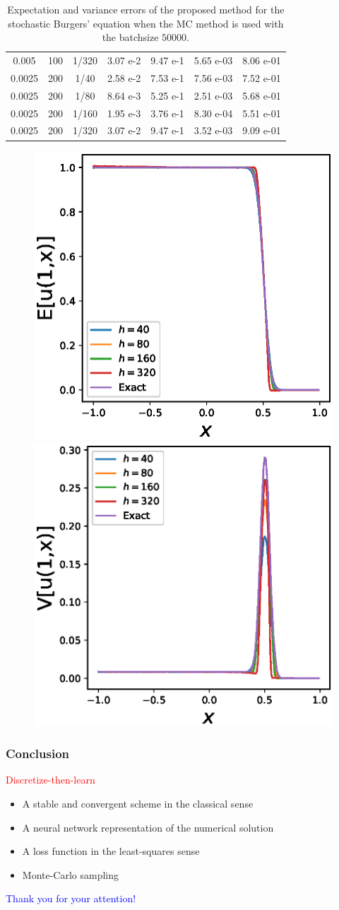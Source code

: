 \documentclass[aspectratio=169]{beamer}
\begin{document}
\begin{frame}
\begin{table}[htbp]
\begin{tabular}{|c|c|c|c|c|c|c|}
		0.005 & 100 & 1/320 & 3.07 e-2 & 9.47 e-1& 5.65 e-03 & 8.06 e-01\\
		0.0025 & 200 & 1/40 & 2.58 e-2 & 7.53 e-1 & 7.56 e-03 & 7.52 e-01\\
		0.0025 & 200 & 1/80 & 8.64 e-3 & 5.25 e-1 & 2.51 e-03 & 5.68 e-01\\
		0.0025 & 200 & 1/160 & 1.95 e-3 & 3.76 e-1 & 8.30 e-04 & 5.51 e-01\\
		0.0025 & 200 & 1/320 & 3.07 e-2 & 9.47 e-1 & 3.52 e-03 & 9.09 e-01\\
		\hline
	\end{tabular}
	\caption{Expectation and variance errors of the proposed method for the stochastic Burgers' equation when the MC method is used with the batchsize $50000$.}
	\label{tbl: s Bur equation 50000 eroor}
\end{table}
\end{frame}
\begin{figure}
\includegraphics[width = 0.4\linewidth]{Figure/Burgus_equation_storchstic_dim_s_10_eps_005_E}
\includegraphics[width = 0.4\linewidth]{Figure/Burgus_equation_storchstic_dim_s_10_eps_005_V}
\end{figure}
\begin{frame}
\frametitle{Conclusion}

{\huge\medskip
	\begin{center}
		\textcolor{red}{Discretize-then-learn}
	\end{center}
}
\begin{itemize}
	\item A stable and convergent scheme in the classical sense
	\item A neural network representation of the numerical solution
	\item A loss function in the least-squares sense
	\item Monte-Carlo sampling
\end{itemize}

{\huge\medskip
	\begin{center}
		\textcolor{blue}{Thank you for your attention!}
	\end{center}
}
\end{frame}
\end{document}
